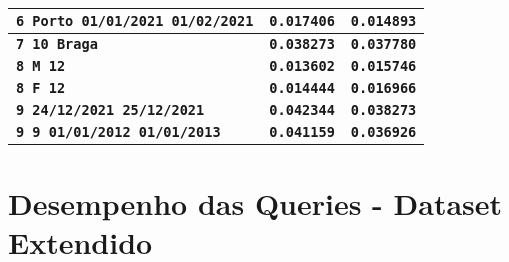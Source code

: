 \documentclass[12pt,a4paper]{report}
\begin{document}
{\begin{tabularx}{\textwidth} { 
  | >{\centering\arraybackslash}X
  | >{\centering\arraybackslash}X
  | >{\centering\arraybackslash}X | }
 \hline
 \texttt{\textbf{6 Porto 01/01/2021 01/02/2021}} & \vspace{-5pt}\texttt{\textbf{0.017406}} & \vspace{-5pt}\texttt{\textbf{0.014893}} \\
 \hline
 \texttt{\textbf{7 10 Braga}} & \texttt{\textbf{0.038273}} & \texttt{\textbf{0.037780}} \\
 \hline
 \texttt{\textbf{8 M 12}} & \texttt{\textbf{0.013602}} & \texttt{\textbf{0.015746}} \\
 \hline
 \texttt{\textbf{8 F 12}} & \texttt{\textbf{0.014444}} & \texttt{\textbf{0.016966}} \\
 \hline
 \texttt{\textbf{9 24/12/2021 25/12/2021}} & \vspace{-5pt}\texttt{\textbf{0.042344}} & \vspace{-5pt}\texttt{\textbf{0.038273}} \\
 \hline
 \texttt{\textbf{9 9 01/01/2012 01/01/2013}} & \vspace{-5pt}\texttt{\textbf{0.041159}} & \vspace{-5pt}\texttt{\textbf{0.036926}} \\
 \hline
 \end{tabularx}
}


\newpage

\section{Desempenho das Queries - Dataset Extendido}
\end{document}
